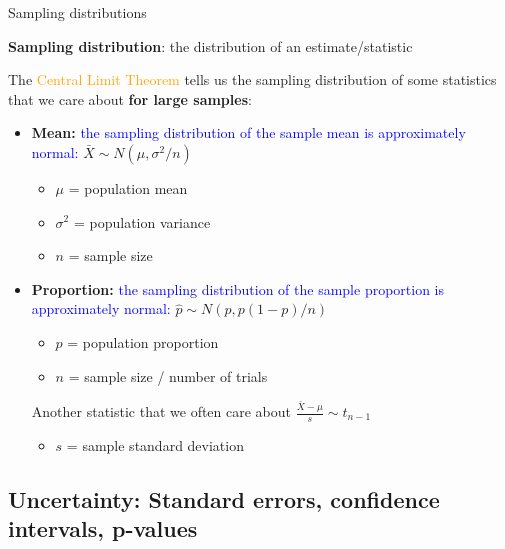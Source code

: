 \documentclass[10pt,t]{beamer}
\begin{document}
\begin{frame}{Sampling distributions}

\vspace{-5 mm}

\textbf{Sampling distribution}: the distribution of an estimate/statistic

\vspace{0.3cm}

The \textcolor{orange}{Central Limit Theorem} tells us the sampling distribution of some statistics that we care about \textbf{for large samples}:
\medskip
\begin{itemize}
	\item \textbf{Mean:} \textcolor{blue}{the sampling distribution of the sample mean is approximately normal:} $\bar{X} \sim N(\mu, \sigma^2 / n)$
	\smallskip
	\begin{itemize}
		\item $\mu$ = population mean
		\smallskip
		\item $\sigma^2$ = population variance
		\smallskip
		\item $n$ = sample size
	\end{itemize}
	\medskip
	\item \textbf{Proportion:} \textcolor{blue}{the sampling distribution of the sample proportion is approximately normal:} $ \hat{p} \sim N(p, p(1-p)/n)$
	\begin{itemize}
		\smallskip
		\item $p$ = population proportion
		\smallskip
		\item $n$ = sample size / number of trials
	\end{itemize}
\medskip
Another statistic that we often care about $\frac{\bar{X} - \mu}{s} \sim t_{n - 1}$
\begin{itemize}
	\smallskip
	\item $s$ = sample standard deviation
\end{itemize}
\end{itemize}

\end{frame}

\subsection{Uncertainty: Standard errors, confidence intervals, p-values}
\end{document}
